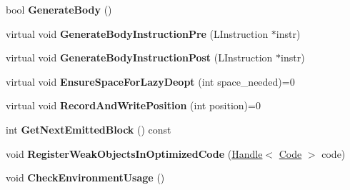 \begin{DoxyCompactItemize}
\item 
\hypertarget{classv8_1_1internal_1_1_b_a_s_e___e_m_b_e_d_d_e_d_a0db546d561999eb4f53c6d857ad6bc71}{}bool {\bfseries Generate\+Body} ()\label{classv8_1_1internal_1_1_b_a_s_e___e_m_b_e_d_d_e_d_a0db546d561999eb4f53c6d857ad6bc71}

\item 
\hypertarget{classv8_1_1internal_1_1_b_a_s_e___e_m_b_e_d_d_e_d_a84df4a40b0e1ff07ae1f37fd99f7ddd7}{}virtual void {\bfseries Generate\+Body\+Instruction\+Pre} (L\+Instruction $\ast$instr)\label{classv8_1_1internal_1_1_b_a_s_e___e_m_b_e_d_d_e_d_a84df4a40b0e1ff07ae1f37fd99f7ddd7}

\item 
\hypertarget{classv8_1_1internal_1_1_b_a_s_e___e_m_b_e_d_d_e_d_ad78397d15dee6aacc484a0302eee4d38}{}virtual void {\bfseries Generate\+Body\+Instruction\+Post} (L\+Instruction $\ast$instr)\label{classv8_1_1internal_1_1_b_a_s_e___e_m_b_e_d_d_e_d_ad78397d15dee6aacc484a0302eee4d38}

\item 
\hypertarget{classv8_1_1internal_1_1_b_a_s_e___e_m_b_e_d_d_e_d_a5421e777348da79d2a29ad796a0c1a95}{}virtual void {\bfseries Ensure\+Space\+For\+Lazy\+Deopt} (int space\+\_\+needed)=0\label{classv8_1_1internal_1_1_b_a_s_e___e_m_b_e_d_d_e_d_a5421e777348da79d2a29ad796a0c1a95}

\item 
\hypertarget{classv8_1_1internal_1_1_b_a_s_e___e_m_b_e_d_d_e_d_afe30c1a13c53c2df1864eab52323ea48}{}virtual void {\bfseries Record\+And\+Write\+Position} (int position)=0\label{classv8_1_1internal_1_1_b_a_s_e___e_m_b_e_d_d_e_d_afe30c1a13c53c2df1864eab52323ea48}

\item 
\hypertarget{classv8_1_1internal_1_1_b_a_s_e___e_m_b_e_d_d_e_d_a7490f8aef83ee316306aeab18bb198d5}{}int {\bfseries Get\+Next\+Emitted\+Block} () const \label{classv8_1_1internal_1_1_b_a_s_e___e_m_b_e_d_d_e_d_a7490f8aef83ee316306aeab18bb198d5}

\item 
\hypertarget{classv8_1_1internal_1_1_b_a_s_e___e_m_b_e_d_d_e_d_ab8e3e2000fcf1823370a7f9fbba5a718}{}void {\bfseries Register\+Weak\+Objects\+In\+Optimized\+Code} (\hyperlink{classv8_1_1internal_1_1_handle}{Handle}$<$ \hyperlink{classv8_1_1internal_1_1_code}{Code} $>$ code)\label{classv8_1_1internal_1_1_b_a_s_e___e_m_b_e_d_d_e_d_ab8e3e2000fcf1823370a7f9fbba5a718}

\item 
\hypertarget{classv8_1_1internal_1_1_b_a_s_e___e_m_b_e_d_d_e_d_a6462f0a0d134871adab89c017c5a1e5f}{}void {\bfseries Check\+Environment\+Usage} ()\label{classv8_1_1internal_1_1_b_a_s_e___e_m_b_e_d_d_e_d_a6462f0a0d134871adab89c017c5a1e5f}


\end{DoxyCompactItemize}
